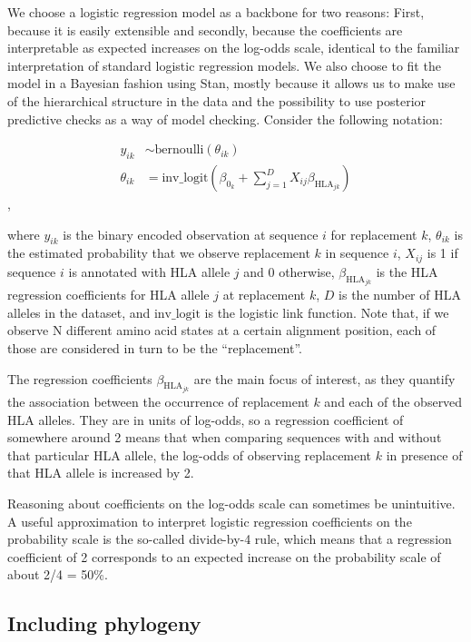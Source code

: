 \documentclass[fleqn,11pt]{SelfArx} %
\begin{document}
We choose a logistic regression model as a backbone for two reasons: First, because it is easily extensible and secondly, because the coefficients are interpretable as expected increases on the log-odds scale, identical to the familiar interpretation of standard logistic regression models.
We also choose to fit the model in a Bayesian fashion using Stan, mostly because it allows us to make use of the hierarchical structure in the data and the possibility to use posterior predictive checks as a way of model checking.
Consider the following notation:

\begin{align}
  y_{ik} & \sim \text{bernoulli}(\theta_{ik}) \\
  \theta_{ik} & = \text{inv\_logit}(\beta_{0_{k}} + \sum_{j=1}^{D} X_{ij}\beta_{\text{HLA}_{jk}})
\end{align}, 

where \(y_{ik}\) is the binary encoded observation at sequence \(i\) for replacement \(k\), \(\theta_{ik}\) is the estimated probability that we observe replacement \(k\) in sequence \(i\), \(X_{ij}\) is 1 if sequence \(i\) is annotated with HLA allele \(j\) and 0 otherwise, \(\beta_{\text{HLA}_{jk}}\) is the HLA regression coefficients for HLA allele \(j\) at replacement \(k\), \(D\) is the number of HLA alleles in the dataset, and \(\text{inv\_logit}\) is the logistic link function. Note that, if we observe N different amino acid states at a certain alignment position, each of those are considered in turn to be the “replacement”.

The regression coefficients \(\beta_{\text{HLA}_{jk}}\) are the main focus of interest, as they quantify the association between the occurrence of replacement \(k\) and each of the observed HLA alleles. They are in units of log-odds, so a regression coefficient of somewhere around 2 means that when comparing sequences with and without that particular HLA allele, the log-odds of observing replacement \(k\) in presence of that HLA allele is increased by 2.

Reasoning about coefficients on the log-odds scale can sometimes be unintuitive. A useful approximation to interpret logistic regression coefficients on the probability scale is the so-called divide-by-4 rule, which means that a regression coefficient of 2 corresponds to an expected increase on the probability scale of about 2/4 = 50\%. 

\subsection*{Including phylogeny}
\end{document}
